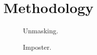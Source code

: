 \chapter{Methodology}
\label{chap:methodology}






\begin{figure}[htbp]
    \centering
    
    \caption{Unmasking.}
    \label{fig:unmasking}
\end{figure}

\begin{figure}[htbp]
    \centering
    
    \caption{Imposter.}
    \label{fig:imposter}
\end{figure}
